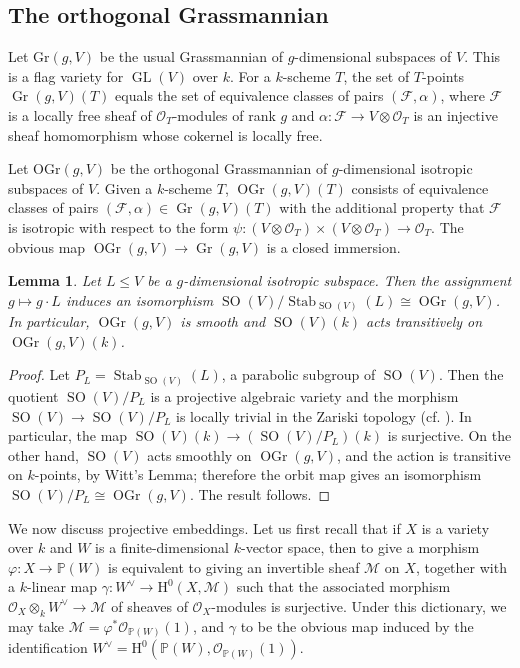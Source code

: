 \documentclass{article} %
\newtheorem{lemma}[proposition]{Lemma}
\numberwithin{equation}{section}
\DeclareMathOperator{\GL}{GL}
\DeclareMathOperator{\SO}{SO}
\DeclareMathOperator{\Stab}{Stab}
\newcommand{\sh}[1]{\mathscr{#1}}
\renewcommand{\P}{\mathbb{P}}
\renewcommand{\O}{\mathcal{O}}
\newcommand{\HH}{\mathrm{H}}
\newcommand{\cO}{\mathcal{O}}
\DeclareMathOperator{\OGr}{OGr}
\DeclareMathOperator{\Gr}{Gr}
\begin{document}
\subsection{The orthogonal Grassmannian}\label{subsec_orthogonal_grassmannian}

Let $\mathrm{Gr}(g,V)$ be the usual Grassmannian of $g$-dimensional subspaces of $V$.
This is a flag variety for $\GL(V)$ over $k$.
For a $k$-scheme $T$, the set of $T$-points $\Gr(g,V)(T)$ equals the set of equivalence classes of pairs $(\sh{F}, \alpha)$, where $\sh{F}$ is a locally free sheaf of $\O_T$-modules of rank $g$ and $\alpha\colon \sh{F}\rightarrow V\otimes \O_T$ is an injective sheaf homomorphism whose cokernel is locally free.


Let $\mathrm{OGr}(g,V)$ be the orthogonal Grassmannian of $g$-dimensional isotropic subspaces of $V$.
Given a $k$-scheme $T$, $\OGr(g,V)(T)$ consists of equivalence classes of pairs $(\sh{F}, \alpha)\in \Gr(g,V)(T)$ with the additional property that $\sh{F}$ is isotropic with respect to the form $\psi\colon (V\otimes \O_T) \times (V\otimes \O_T) \rightarrow \O_T$.
The obvious map $\OGr(g,V)\rightarrow \Gr(g,V)$ is a closed immersion.
\begin{lemma}
    Let $L\leq V$ be a $g$-dimensional isotropic subspace.
    Then the assignment $g\mapsto g\cdot L$ induces an isomorphism $\SO(V) / \Stab_{\SO(V)}(L) \cong \OGr(g,V)$.
    In particular, $\OGr(g,V)$ is smooth and $\SO(V)(k)$ acts transitively on $\OGr(g,V)(k)$.
\end{lemma}
\begin{proof}
    Let $P_L = \Stab_{\SO(V)}(L)$, a parabolic subgroup of $\SO(V)$. Then the quotient $\SO(V) / P_L$ is a projective algebraic variety and the morphism $\SO(V) \to \SO(V) / P_L$ is locally trivial in the Zariski topology (cf. \cite[Part II, 1.10]{Jan03}). In particular, the map $\SO(V)(k) \to (\SO(V) / P_L)(k)$ is surjective. On the other hand, $\SO(V)$ acts smoothly on $\OGr(g, V)$, and the action is transitive on $k$-points, by Witt's Lemma; therefore the orbit map gives an isomorphism $\SO(V) / P_L \cong \OGr(g, V)$. The result follows. 
\end{proof}
We now discuss projective embeddings. Let us first recall that if $X$ is a variety over $k$ and $W$ is a finite-dimensional $k$-vector space, then to give a morphism $\varphi : X \to \P(W)$ is equivalent to giving an invertible sheaf $\sh{M}$ on $X$, together with a $k$-linear map $\gamma : W^\vee \to\HH^0(X, \sh{M})$ such that the associated morphism $\cO_X \otimes_k W^\vee \to \sh{M}$ of sheaves of $\cO_X$-modules is surjective. Under this dictionary, we may take $\sh{M} = \varphi^\ast \cO_{\P(W)}(1)$, and $\gamma$ to be the obvious map induced by the identification $W^\vee =\HH^0(\P(W), \cO_{\P(W)}(1))$.
\end{document}
